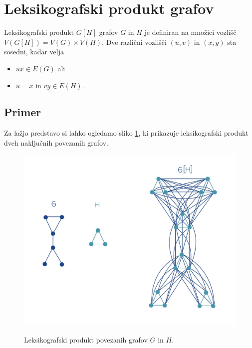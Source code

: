\documentclass[mat1, tisk]{fmfdelo}
\newcommand{\1}{(1, 1, ..., 1)}
\newcommand{\2}{(2, 2, ..., 2)}
\begin{document}
\section{Leksikografski produkt grafov}\label{s:leks_prod}


\begin{definicija} \label{def:leks_prod}
    Leksikografski produkt $G[H]$ grafov $G$ in $H$ je definiran na množici vozlišč 
    $V (G[H]) = V (G)\times V (H)$. Dve različni vozlišči $(u, v)$ in $(x, y)$ sta 
    sosedni, kadar velja
\begin{itemize}
    \item $ux \in E(G)$ ali
    \item $u = x$ in $vy \in E(H).$ 
\end{itemize}
\end{definicija}




\subsection{Primer} 
Za lažjo predstavo si lahko ogledamo sliko \ref{fig:produkt}, ki prikazuje leksikografski 
produkt dveh naključnih povezanih grafov.

\begin{figure}[h]
    \centering
    \includegraphics[width=\textwidth]{IMG_produkt.jpg}   
    \label{fig:produkt}
    \caption{Leksikografski produkt povezanih grafov $G$ in $H$.}   
\end{figure}
\end{document}
